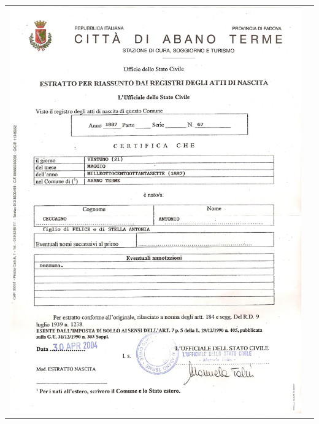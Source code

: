\documentclass[a4paper,10pt]{book}
\begin{document}
\begin{tabular}{ c c }
  \includegraphics[height=0.35\textheight]{../img/07-antonio.png}\label{fig:07-antonio}
  &

\end{tabular}
\end{document}
